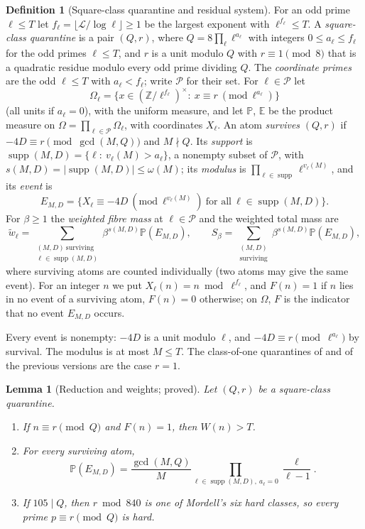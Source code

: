 \documentclass[11pt,reqno]{amsart}
\newtheorem{lemma}[theorem]{Lemma}
\theoremstyle{definition}
\newtheorem{definition}[theorem]{Definition}
\newcommand{\cP}{\mathcal P}
\newcommand{\Lc}{\mathcal L}
\newcommand{\E}{\mathbb E}
\newcommand{\PP}{\mathbb P}
\newcommand{\supp}{\operatorname{supp}}
\begin{document}
\begin{definition}[Square-class quarantine and residual system]\label{def:system}
For an odd prime $\ell\le T$ let $f_\ell=\lfloor\Lc/\log\ell\rfloor\ge1$ be the
largest exponent with $\ell^{f_\ell}\le T$.  A \emph{square-class quarantine}
is a pair $(Q,r)$, where $Q=8\prod_\ell\ell^{a_\ell}$ with integers
$0\le a_\ell\le f_\ell$ for the odd primes $\ell\le T$, and $r$ is a unit modulo
$Q$ with $r\equiv1\pmod8$ that is a quadratic residue modulo every odd prime
dividing $Q$.  The \emph{coordinate primes} are the odd $\ell\le T$ with
$a_\ell<f_\ell$; write $\cP$ for their set.  For $\ell\in\cP$ let
\[
 \Omega_\ell=\{x\in(\mathbb Z/\ell^{f_\ell})^\times:\ x\equiv r\ (\mathrm{mod}\ \ell^{a_\ell})\}
\]
(all units if $a_\ell=0$), with the uniform measure, and let $\PP$, $\E$ be
the product measure on $\Omega=\prod_{\ell\in\cP}\Omega_\ell$, with coordinates
$X_\ell$.  An atom \emph{survives} $(Q,r)$ if $-4D\equiv r\pmod{\gcd(M,Q)}$ and
$M\nmid Q$.  Its \emph{support} is $\supp(M,D)=\{\ell:\ v_\ell(M)>a_\ell\}$, a
nonempty subset of $\cP$, with $s(M,D)=|\supp(M,D)|\le\omega(M)$; its
\emph{modulus} is $\prod_{\ell\in\supp}\ell^{v_\ell(M)}$, and its \emph{event} is
\[
 E_{M,D}=\{X_\ell\equiv-4D\ (\mathrm{mod}\ \ell^{v_\ell(M)})\ \text{for all}\ \ell\in\supp(M,D)\}.
\]
For $\beta\ge1$ the \emph{weighted fibre mass} at $\ell\in\cP$ and the
weighted total mass are
\[
 \tilde w_\ell=\sum_{\substack{(M,D)\ \text{surviving}\\ \ell\in\supp(M,D)}}\beta^{s(M,D)}\PP(E_{M,D}),\qquad
 S_\beta=\sum_{\substack{(M,D)\\ \text{surviving}}}\beta^{s(M,D)}\PP(E_{M,D}),
\]
where surviving atoms are counted individually (two atoms may give the same
event).  For an integer $n$ we put $X_\ell(n)=n\bmod\ell^{f_\ell}$, and $F(n)=1$
if $n$ lies in no event of a surviving atom, $F(n)=0$ otherwise; on
$\Omega$, $F$ is the indicator that no event $E_{M,D}$ occurs.
\end{definition}

Every event is nonempty: $-4D$ is a unit modulo $\ell$, and
$-4D\equiv r\pmod{\ell^{a_\ell}}$ by survival.  The modulus is at most $M\le T$.
The class-of-one quarantines of \cite{Paper1} and of the previous versions
are the case $r=1$.

\begin{lemma}[Reduction and weights; proved]\label{lem:system}
Let $(Q,r)$ be a square-class quarantine.
\begin{enumerate}
\item[(i)] If $n\equiv r\pmod Q$ and $F(n)=1$, then $W(n)>T$.
\item[(ii)] For every surviving atom,
\[
 \PP(E_{M,D})=\frac{\gcd(M,Q)}M\prod_{\ell\in\supp(M,D),\ a_\ell=0}\frac{\ell}{\ell-1}.
\]
\item[(iii)] If $105\mid Q$, then $r\bmod 840$ is one of Mordell's six
hard classes, so every prime $p\equiv r\pmod Q$ is hard.
\end{enumerate}
\end{lemma}
\end{document}
